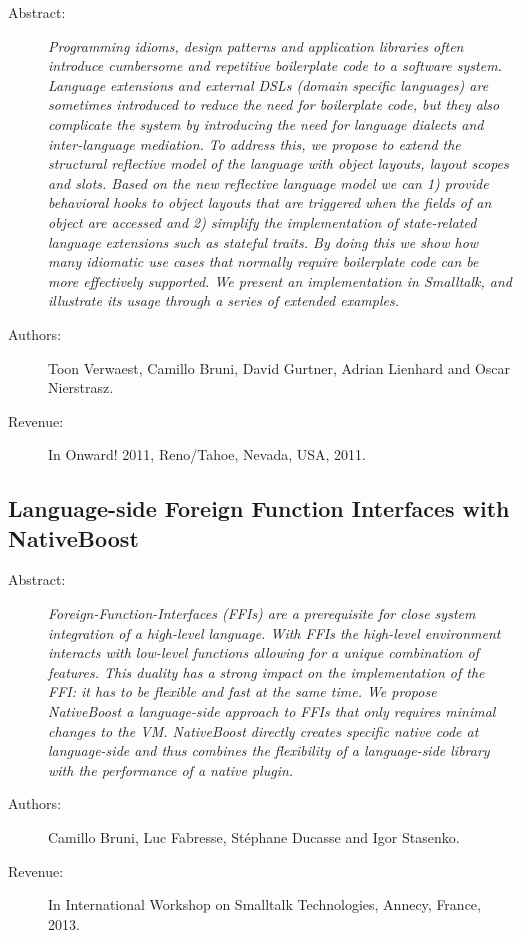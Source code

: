 \begin{description}
	\item[Abstract:] \emph{
Programming idioms, design patterns and application libraries often introduce cumbersome and repetitive boilerplate code to a software system.
Language extensions and external {DSLs} (domain specific languages) are sometimes introduced to reduce the need for boilerplate code, but they also complicate the system by introducing the need for language dialects and inter-language mediation.
To address this, we propose to extend the structural reflective model of the language with object layouts, layout scopes and slots.
Based on the new reflective language model we can 1) provide behavioral hooks to object layouts that are triggered when the fields of an object are accessed and 2) simplify the implementation of state-related language extensions such as stateful traits.
By doing this we show how many idiomatic use cases that normally require boilerplate code can be more effectively supported.
We present an implementation in Smalltalk, and illustrate its usage through a series of extended examples.}

	\item[Authors:] Toon Verwaest, Camillo Bruni, David Gurtner, Adrian Lienhard and Oscar Nierstrasz. 
	\item[Revenue:] In Onward! 2011, Reno/Tahoe, Nevada, USA, 2011.
\end{description}

\subsection{Language-side Foreign Function Interfaces with NativeBoost}
\begin{description}
	\item[Abstract:] \emph{
Foreign-Function-Interfaces (FFIs) are a prerequisite for close system integration of a high-level language.
With FFIs the high-level environment interacts with low-level functions allowing for a unique combination of features.
This duality has a strong impact on the implementation of the FFI: it has to be flexible and fast at the same time.
We propose NativeBoost a language-side approach to FFIs that only requires minimal changes to the VM.
NativeBoost directly creates specific native code at language-side and thus combines the flexibility of a language-side library with the performance of a native plugin.}

	\item[Authors:]  Camillo Bruni, Luc Fabresse, Stéphane Ducasse and Igor Stasenko. 
	\item[Revenue:] In International Workshop on Smalltalk Technologies, Annecy, France, 2013.
\end{description}



